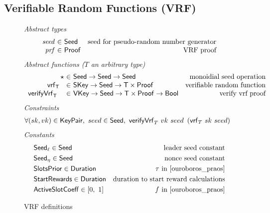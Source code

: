 \subsection{Verifiable Random Functions (VRF)}
\label{sec:defs-vrf}

\begin{figure}[htb]
  \emph{Abstract types}
  \begin{equation*}
    \begin{array}{r@{~\in~}lr}
      \var{seed} & \Seed  & \text{seed for pseudo-random number generator}\\
      \var{prf} & \Proof  & \text{VRF proof}\\
    \end{array}
  \end{equation*}
  \emph{Abstract functions ($T$ an arbitrary type)}
  \begin{equation*}
    \begin{array}{r@{~\in~}lr}
      \seedOp & \Seed \to \Seed \to \Seed & \text{monoidial seed operation} \\
      \vrf{\T}{}{} & \SKey \to \Seed \to \T\times\Proof
                   & \text{verifiable random function} \\
      \verifyVrf{\T}{}{}{} & \VKey \to \Seed \to \T\times\Proof \to \Bool
                           & \text{verify vrf proof} \\
    \end{array}
  \end{equation*}
  \emph{Constraints}
  \begin{align*}
    & \forall (sk, vk) \in \mathsf{KeyPair},~ seed \in \mathsf{Seed},~
    \mathsf{verifyVrf}_{T} ~ vk ~ seed ~\left(\mathsf{vrf}_{T} ~ sk ~ seed\right)
  \end{align*}
  \emph{Constants}
  \begin{align*}
    & \mathsf{Seed}_\ell \in \mathsf{Seed} & \text{leader seed constant} \\
    & \mathsf{Seed}_\eta \in \mathsf{Seed} & \text{nonce seed constant}\\
    & \mathsf{SlotsPrior} \in \mathsf{Duration} & \tau\text{ in \cite{ouroboros_praos}}\\
    & \mathsf{StartRewards} \in \mathsf{Duration} & \text{duration to start reward calculations}\\
    & \mathsf{ActiveSlotCoeff} \in [0,~1] & f\text{ in \cite{ouroboros_praos}}\\
  \end{align*}

  \caption{VRF definitions}
  \label{fig:defs-vrf}
\end{figure}

